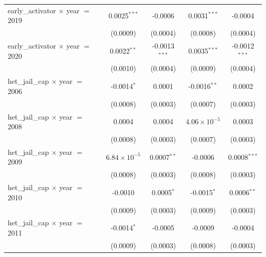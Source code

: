 \begin{tabular}{lcccc}
   early\_activator $\times$ year $=$ 2019              & 0.0025$^{***}$        & -0.0006                   & 0.0031$^{***}$         & -0.0004\\   
                                                        & (0.0009)              & (0.0004)                  & (0.0008)               & (0.0004)\\   
   early\_activator $\times$ year $=$ 2020              & 0.0022$^{**}$         & -0.0013$^{***}$           & 0.0035$^{***}$         & -0.0012$^{***}$\\   
                                                        & (0.0010)              & (0.0004)                  & (0.0009)               & (0.0004)\\   
   het\_jail\_cap $\times$ year $=$ 2006                & -0.0014$^{*}$         & 0.0001                    & -0.0016$^{**}$         & 0.0002\\   
                                                        & (0.0008)              & (0.0003)                  & (0.0007)               & (0.0003)\\   
   het\_jail\_cap $\times$ year $=$ 2008                & 0.0004                & 0.0004                    & $4.06\times 10^{-5}$   & 0.0003\\   
                                                        & (0.0008)              & (0.0003)                  & (0.0007)               & (0.0003)\\   
   het\_jail\_cap $\times$ year $=$ 2009                & $6.84\times 10^{-5}$  & 0.0007$^{**}$             & -0.0006                & 0.0008$^{***}$\\   
                                                        & (0.0008)              & (0.0003)                  & (0.0008)               & (0.0003)\\   
   het\_jail\_cap $\times$ year $=$ 2010                & -0.0010               & 0.0005$^{*}$              & -0.0015$^{*}$          & 0.0006$^{**}$\\   
                                                        & (0.0009)              & (0.0003)                  & (0.0009)               & (0.0003)\\   
   het\_jail\_cap $\times$ year $=$ 2011                & -0.0014$^{*}$         & -0.0005                   & -0.0009                & -0.0004\\   
                                                        & (0.0009)              & (0.0003)                  & (0.0008)               & (0.0003)\\   

\end{tabular}
